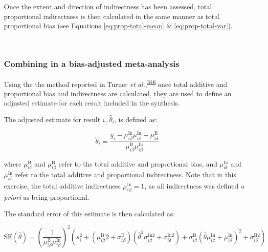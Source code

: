 \documentclass[a4paper, twoside]{templates/ociamthesis}
\begin{document}
Once the extent and direction of indirectness has been assessed, total proportional indirectness is then calculated in the same manner as total proportional bias (see Equations \eqref{eq:prop-total-mean} \& \eqref{eq:prop-total-var}).

~

\hypertarget{combining-in-a-bias-adjusted-meta-analysis}{%
\subsubsection{Combining in a bias-adjusted meta-analysis}\label{combining-in-a-bias-adjusted-meta-analysis}}

Using the the method reported in Turner \emph{et al.},\textsuperscript{\protect\hyperlink{ref-turner2009}{346}} once total additive and proportional bias and indirectness are calculated, they are used to define an adjusted estimate for each result included in the synthesis.

The adjusted estimate for result \(i\), \(\hat{\theta}_i\), is defined as:

\begin{equation}
  \hat{\theta}_i = \frac{y_i - \mu_{i\beta}^{\mathrm{In}}\mu_{i\delta}^{\mathrm{In}} - \mu_{i\delta}^{\mathrm{B}}}{\mu_{i\beta}^{\mathrm{B}}\mu_{i\beta}^{\mathrm{In}}}
  \label{eq:adjusted-mean}
\end{equation}

where \(\mu_{i\delta}^{\mathrm{B}}\) and \(\mu_{i\beta}^{\mathrm{B}}\) refer to the total additive and proportional bias, and \(\mu_{i\delta}^{\mathrm{In}}\) and \(\mu_{i\beta}^{\mathrm{In}}\) refer to the total additive and proportional indirectness. Note that in this exercise, the total additive indirectness \(\mu_{i\beta}^{\mathrm{In}} = 1\), as all indirectness was defined \emph{a priori} as being proportional.

The standard error of this estimate is then calculated as:

\begin{equation}
  \mathrm{SE}(\hat{\theta})=\left(\frac{1}{\mu_{i \beta}^{\mathrm{B}} \mu_{i \beta}^{\mathrm{In}}}\right)^{2}\left(s_{i}^{2}+\left(\mu_{i \beta}^{\mathrm{B}} 2+\sigma_{i \beta}^{\mathrm{B}}\right)\left(\hat{\theta}^{2} \sigma_{i \beta}^{\mathrm{In} 2}+\sigma_{i \delta}^{\mathrm{In} 2}\right)+\sigma_{i \beta}^{\mathrm{B}}\left(\hat{\theta} \mu_{i \beta}^{\mathrm{In}}+\mu_{i \delta}^{\mathrm{In}}\right)^{2}+\sigma_{i \delta}^{\mathrm{B} 2}\right)
  \label{eq:adjusted-se}
\end{equation}
\end{document}
